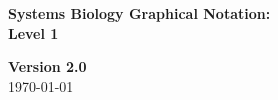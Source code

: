 
\begin{titlepage}

\vspace*{0.75in}

\begin{center}

  \textbf{\sffamily\bfseries\huge
    Systems Biology Graphical Notation:\\[0.3em]
    \PDl Level 1}

\vspace*{0.5in}

\Large
\textbf{Version 2.0}\\[0.1in]
\large
\today\\[0.25in]
% 
% 




\end{center}
\end{titlepage}
